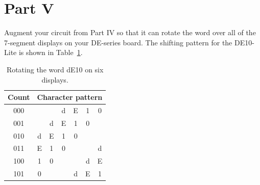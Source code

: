 \documentclass[epsfig,10pt,fullpage]{article}
\newcommand{\CommonDocsPath}{../../../common/docs}
\begin{document}
\section*{Part V}
Augment your circuit from Part IV so that it can rotate the word over all of the
7-segment displays on your DE-series board. The shifting pattern for the DE10-Lite is shown in
Table~\ref{tab:rotate2}.

\begin{table}[h]
\begin{minipage}[t]{12.5 cm}
\begin{center}
\begin{tabular}{c|cccccc}
Count& \multicolumn{6}{c}{Character pattern} \\
\hline
{\rule[0mm]{0mm}{5mm}000} & & & d & E & 1 & 0 \\ 
001 & & d & E & 1 & 0 & \\
010 & d & E & 1 & 0 & & \\
011 & E & 1 & 0 & & & d\\
100 & 1 & 0 & & & d & E \\
101 & 0 & & & d  & E & 1 \\
\end{tabular}
\end{center}
\end{minipage}
\caption{Rotating the word dE10 on six displays.}
\label{tab:rotate2}
\end{table}



\end{document}
